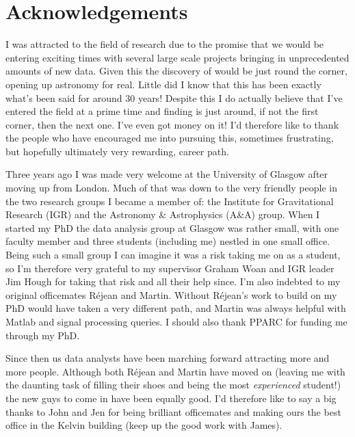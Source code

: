 

\newpage
\chapter*{Acknowledgements}
I was attracted to the field of \gw research due to the promise that we would be entering exciting
times with several large scale projects bringing in unprecedented amounts of new data. Given this
the discovery of \gws would be just round the corner, opening up \gw astronomy for real. Little did
I know that this has been exactly what's been said for around 30 years! Despite this I do actually
believe that I've entered the field at a prime time and finding \gws is just around, if not the
first corner, then the next one. I've even got money on it! I'd therefore like to thank the
people who have encouraged me into pursuing this, sometimes frustrating, but hopefully ultimately
very rewarding, career path.

Three years ago I was made very welcome at the University of Glasgow after moving up from London.
Much of that was down to the very friendly people in the two research groups I became a member of:
the Institute for Gravitational Research (IGR) and the Astronomy \& Astrophysics (A\&A) group. When
I started my PhD the \gw data analysis group at Glasgow was rather small, with one faculty member
and three students (including me) nestled in one small office. Being such a small group I can
imagine it was a risk taking me on as a student, so I'm therefore very grateful to my supervisor
Graham Woan and IGR leader Jim Hough for taking that risk and all their help since. I'm also
indebted to my original officemates R\'ejean and Martin. Without R\'ejean's work to build on my PhD
would have taken a very different path, and Martin was always helpful with Matlab and signal
processing queries. I should also thank PPARC for funding me through my PhD.

Since then us data analysts have been marching forward attracting more and more people. Although
both R\'ejean and Martin have moved on (leaving me with the daunting task of filling their shoes and
being the most {\it experienced} student!) the new guys to come in have been equally good. I'd
therefore like to say a big thanks to John and Jen for being brilliant officemates and making ours
the best office in the Kelvin building (keep up the good work with James). 

